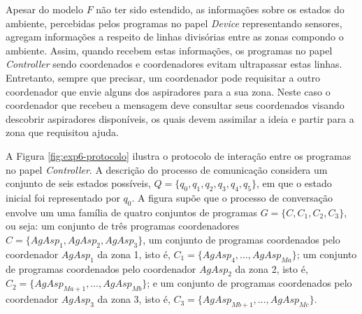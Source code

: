 Apesar do modelo $F$ não ter sido estendido, as informações sobre os estados do ambiente, percebidas pelos programas no papel \textit{Device} representando sensores, agregam informações a respeito de linhas divisórias entre as zonas compondo o ambiente. Assim, quando recebem estas informações, os programas no papel \textit{Controller} sendo coordenados e coordenadores evitam ultrapassar estas linhas. Entretanto, sempre que precisar, um coordenador pode requisitar a outro coordenador que envie alguns dos aspiradores para a sua zona. Neste caso o coordenador que recebeu a mensagem deve consultar seus coordenados visando descobrir aspiradores disponíveis, os quais devem assimilar a ideia e partir para a zona que requisitou ajuda. 

A Figura \ref{fig:exp6-protocolo} ilustra o protocolo de interação entre os programas no papel \textit{Controller}. A descrição do processo de comunicação considera um conjunto de seis estados possíveis, $Q = \{q_0, q_1, q_2, q_3, q_4, q_5\}$, em que o estado inicial foi representado por $q_0$. A figura supõe que o processo de conversação envolve um uma família de quatro conjuntos de programas $G = \{C, C_1, C_2, C_3\}$, ou seja: um conjunto de três programas coordenadores $C = \{AgAsp_1, AgAsp_2, AgAsp_3\}$, um conjunto de programas coordenados pelo coordenador $AgAsp_1$ da zona 1, isto é, $C_1 = \{AgAsp_4, \ldots, AgAsp_{Ma}\}$; um conjunto de programas coordenados pelo coordenador $AgAsp_2$ da zona 2, isto é, $C_2 = \{AgAsp_{Ma+1}, \ldots, AgAsp_{Mb}\}$; e um conjunto de programas coordenados pelo coordenador $AgAsp_3$ da zona 3, isto é, $C_3 = \{AgAsp_{Mb+1},  \ldots, AgAsp_{Mc}\}$.

\begin{figure}[h!]
    \centering
\end{figure}

